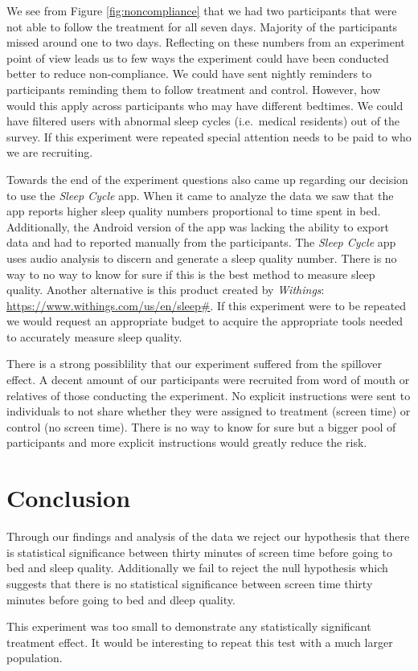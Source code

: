 \documentclass[12pt,]{article}
\begin{document}
We see from Figure \ref{fig:noncompliance} that we had two participants
that were not able to follow the treatment for all seven days. Majority
of the participants missed around one to two days. Reflecting on these
numbers from an experiment point of view leads us to few ways the
experiment could have been conducted better to reduce non-compliance. We
could have sent nightly reminders to participants reminding them to
follow treatment and control. However, how would this apply across
participants who may have different bedtimes. We could have filtered
users with abnormal sleep cycles (i.e.~medical residents) out of the
survey. If this experiment were repeated special attention needs to be
paid to who we are recruiting.

Towards the end of the experiment questions also came up regarding our
decision to use the \emph{Sleep Cycle} app. When it came to analyze the
data we saw that the app reports higher sleep quality numbers
proportional to time spent in bed. Additionally, the Android version of
the app was lacking the ability to export data and had to reported
manually from the participants. The \emph{Sleep Cycle} app uses audio
analysis to discern and generate a sleep quality number. There is no way
to no way to know for sure if this is the best method to measure sleep
quality. Another alternative is this product created by \emph{Withings}:
\url{https://www.withings.com/us/en/sleep\#}. If this experiment were to
be repeated we would request an appropriate budget to acquire the
appropriate tools needed to accurately measure sleep quality.

There is a strong possiblility that our experiment suffered from the
spillover effect. A decent amount of our participants were recruited
from word of mouth or relatives of those conducting the experiment. No
explicit instructions were sent to individuals to not share whether they
were assigned to treatment (screen time) or control (no screen time).
There is no way to know for sure but a bigger pool of participants and
more explicit instructions would greatly reduce the risk.

\section{Conclusion}\label{conclusion}

Through our findings and analysis of the data we reject our hypothesis
that there is statistical significance between thirty minutes of screen
time before going to bed and sleep quality. Additionally we fail to
reject the null hypothesis which suggests that there is no statistical
significance between screen time thirty minutes before going to bed and
dleep quality.

This experiment was too small to demonstrate any statistically
significant treatment effect. It would be interesting to repeat this
test with a much larger population.
\end{document}
